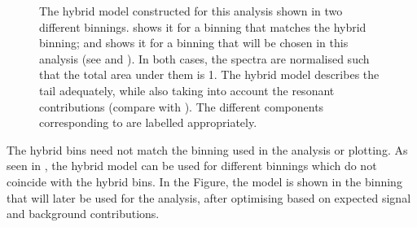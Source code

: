 \begin{figure}[htbp!]
    \caption{\label{fig:hybrid_bins_and_model} The hybrid model constructed for this analysis 
    shown in two different binnings.
     shows it for a binning that matches the hybrid binning; 
    and  shows it for a binning that will 
    be chosen in this analysis (see  and ).
    In both cases, the spectra are normalised such that the total area under them is 1.
    The hybrid model describes the tail adequately, 
    while also taking into account the resonant contributions (compare with ).
    The different components corresponding to  are labelled appropriately.
    }
\end{figure}

The hybrid bins need not match the binning used in the analysis or plotting.
As seen in , the hybrid model can be used for different binnings which do not coincide with the hybrid bins.
In the Figure, the model is shown in the binning that will later be used for the analysis, after optimising based on expected signal and background contributions.

